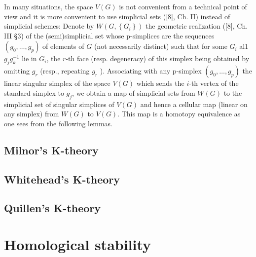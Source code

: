 \documentclass{report}
\begin{document}
In many situations, the space $V(G)$ is not convenient from a technical point of view and it is more convenient to use simplicial sets ([8], Ch. II) instead of simplicial schemes: Denote by $W\left(G,\left\{G_i\right\}\right)$ the geometric realization ([8], Ch. III §3) of the (semi)simplicial set whose p-simplices are the sequences $\left(g_0, \ldots, g_p\right)$ of elements of $G$ (not necessarily distinct) such that for some $G_i$ al1 $g_j g_k^{-1}$ lie in $G_i$, the $r$-th face (resp. degeneracy) of this simplex being obtained by omitting $g_r$ (resp., repeating $g_r$ ). Associating with any p-simplex $\left(g_0, \ldots, g_p\right)$ the linear singular simplex of the space $V(G)$ which sends the $i$-th vertex of the standard simplex to $g_j$, we obtain a map of simplicial sets from $W(G)$ to the simplicial set of singular simplices of $V(G)$ and hence a cellular map (linear on any simplex) from $W(G)$ to $V(G)$. This map is a homotopy equivalence as one sees from the following lemmas.








\section{Milnor's K-theory}


\section{Whitehead's K-theory}

\section{Quillen's K-theory}



\chapter{Homological stability}
\end{document}
